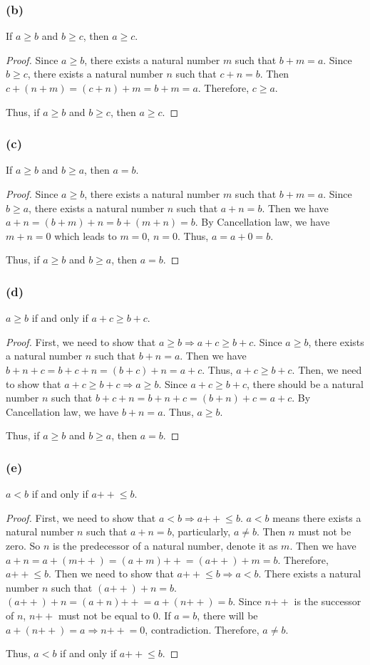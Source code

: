 \documentclass[12pt, letter]{article}
\begin{document}
\subsubsection*{(b)}
If $a\geq b$ and $b\geq c$, then $a\geq c$.
\begin{proof}
    Since $a\geq b$, there exists a natural number $m$ such that $b+m=a$. Since $b\geq c$, there exists a natural 
    number $n$ such that $c+n=b$. Then $c+(n+m)=(c+n)+m=b+m=a$. Therefore, $c\geq a$.

    Thus, if $a\geq b$ and $b\geq c$, then $a\geq c$.
\end{proof}
\subsubsection*{(c)}
If $a\geq b$ and $b\geq a$, then $a=b$.
\begin{proof}
    Since $a\geq b$, there exists a natural number $m$ such that $b+m=a$. Since $b\geq a$, there exists a natural number $n$ such that $a+n=b$. Then we have $a+n=(b+m)+n=b+(m+n)=b$. 
    By Cancellation law, we have $m+n=0$ which leads to $m=0$, $n=0$. Thus, $a=a+0=b$. 

    Thus, if $a\geq b$ and $b\geq a$, then $a=b$.
\end{proof}
\subsubsection*{(d)}
$a\geq b$ if and only if $a+c\geq b+c$.
\begin{proof}
    First, we need to show that $a\geq b \Rightarrow a+c\geq b+c$. Since $a\geq b$, there exists a natural number $n$ such that 
    $b+n=a$. Then we have $b+n+c=b+c+n=(b+c)+n=a+c$. Thus, $a+c\geq b+c$. Then, we need to show that $a+c\geq b+c\Rightarrow a\geq b$. Since $a+c\geq b+c$, there should be a natural number $n$ such 
    that $b+c+n=b+n+c=(b+n)+c=a+c$. By Cancellation law, we have $b+n=a$. Thus, $a\geq b$. 

    Thus, if $a\geq b$ and $b\geq a$, then $a=b$.
\end{proof}
\subsubsection*{(e)}
$a<b$ if and only if $a\mathtt{++}\leq b$.
\begin{proof}
    First, we need to show that $a<b\Rightarrow a\mathtt{++}\leq b$. $a<b$ means there exists a natural number $n$ such that 
    $a+n=b$, particularly, $a\ne b$. Then $n$ must not be zero. So $n$ is the predecessor of a natural number, denote it as $m$. Then we have $a+n=a+(m\mathtt{++})=(a+m)\mathtt{++}=(a\mathtt{++})+m=b$. Therefore, $a\mathtt{++}\leq b$. Then 
    we need to show that $a\mathtt{++}\leq b\Rightarrow a<b$. There exists a natural number $n$ such that $(a\mathtt{++})+n=b$. $(a\mathtt{++})+n=(a+n)\mathtt{++}=a+(n\mathtt{++})=b$. Since $n\mathtt{++}$ is the successor of $n$, $n\mathtt{++}$ must not be equal to $0$.
    If $a=b$, there will be $a+(n\mathtt{++})=a\Rightarrow n\mathtt{++}=0$, contradiction. Therefore, $a\ne b$. 
    
    Thus, $a<b$ if and only if $a\mathtt{++}\leq b$.
\end{proof}
\end{document}

